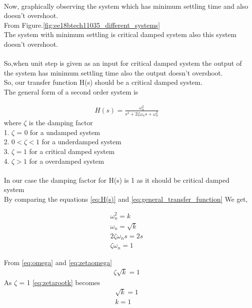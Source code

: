 \begin{enumerate}[label=\thesection.\arabic*.,ref=\thesection.\theenumi]
\\Now, graphically observing the system which has minimum settling time and also doesn't overshoot.
\\From Figure.\eqref{fig:ee18btech11035_different_systems}
\\The system with minimum settling is critical damped system also this system doesn't overshoot.
\\
\\
So,when unit step is given as an input for critical damped system the output of the system has minimum settling time also the output doesn't overshoot.\\
So, our transfer function H(s) should be a critical damped system.\\
The general form of a second order system is 

\begin{align}
H(s) = \frac{\omega_n^2}{s^2+2\zeta\omega_ns+\omega_n^2}
\label{eq:general_transfer_function}
\end{align}
where \(\zeta \)  is the damping factor \\
1. \(\zeta \) = 0 for a undamped system \\
2. \(0 < \zeta  < 1\) for a underdamped system \\
3. \(\zeta  = 1\) for a critical damped system \\
4. \(\zeta  > 1\) for a overdamped system \\
\\ In our case the damping factor for H(s) is 1 as it should be critical damped system \\

By comparing the equations \eqref{eq:H(s)} and \eqref{eq:general_transfer_function}
We get,

\begin{align}
\omega_n^2 = k\\
\label{eq:omega}
\omega_n = \sqrt{k}\\
2\zeta\omega_ns = 2s\\
\label{eq:zetaomega}
\zeta\omega_n = 1
\end{align}

From \eqref{eq:omega} and \eqref{eq:zetaomega} \\
\begin{align}
\zeta\sqrt{k} = 1
\label{eq:zetarootk}
\end{align}
As \(\zeta\) = 1 \eqref{eq:zetarootk} becomes 
\begin{align}
\sqrt{k} = 1\\
k = 1
\end{align}


\end{enumerate}
